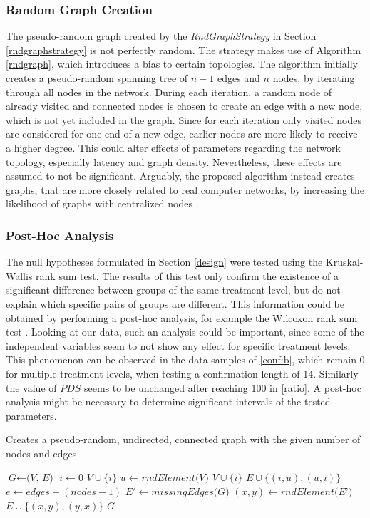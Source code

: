 \documentclass[a4paper,12pt,twoside]{report}
\begin{document}
\subsubsection{Random Graph Creation}
The pseudo-random graph created by the \textit{RndGraphStrategy} in Section \ref{rndgraphstrategy} is not perfectly random. The strategy makes use of Algorithm \ref{rndgraph}, which introduces a bias to certain topologies. The algorithm initially creates a pseudo-random spanning tree of $n-1$ edges and $n$ nodes, by iterating through all nodes in the network. During each iteration, a random node of already visited and connected nodes is chosen to create an edge with a new node, which is not yet included in the graph. Since for each iteration only visited nodes are considered for one end of a new edge, earlier nodes are more likely to receive a higher degree. This could alter effects of parameters regarding the network topology, especially latency and graph density. Nevertheless, these effects are assumed to not be significant. Arguably, the proposed algorithm instead creates graphs, that are more closely related to real computer networks, by increasing the likelihood of graphs with centralized nodes \cite{stackoverflow}.
\subsubsection{Post-Hoc Analysis}
The null hypotheses formulated in Section \ref{design} were tested using the Kruskal-Wallis rank sum test. The results of this test only confirm the existence of a significant difference between groups of the same treatment level, but do not explain which specific pairs of groups are different. This information could be obtained by performing a post-hoc analysis, for example the Wilcoxon rank sum test \cite{wilcoxon}. Looking at our data, such an analysis could be important, since some of the independent variables seem to not show any effect for specific treatment levels. This phenomenon can be observed in the data samples of \autoref{conf:b}, which remain 0 for multiple treatment levels, when testing a confirmation length of 14. Similarly the value of $PDS$ seems to be unchanged after reaching 100 in \autoref{ratio}. A post-hoc analysis might be necessary to determine significant intervals of the tested parameters.

\begin{algorithm}
\caption{Creates a pseudo-random, undirected, connected graph with the given number of nodes and edges}\label{rndgraph}
\begin{algorithmic}[1]
\State $\textit{G} \gets \textit{(V, E)}$
\State $i \gets 0$
\State $V \cup \{i \}$
\State $u \gets \textit{rndElement(V)}$
\State $V \cup \{i \}$
\State $E \cup \{(i,u),(u,i) \}$
\EndWhile
\State $e \gets edges - (nodes-1)$
\State $E' \gets \textit{missingEdges(G)}$
\State $(x,y) \gets \textit{rndElement(E')}$
\State $E \cup \{(x,y),(y,x) \}$
\EndWhile
\State \Return $G$
\EndProcedure
\end{algorithmic}
\end{algorithm}
\end{document}
